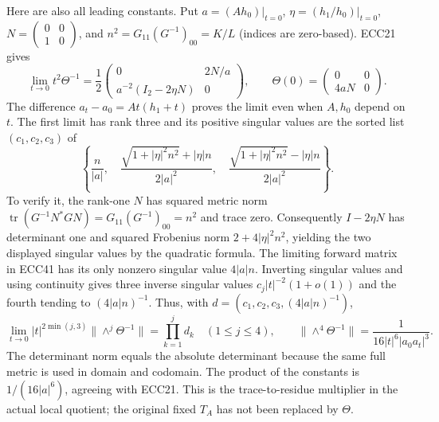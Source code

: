\documentclass[11pt]{article}
\newcommand{\Tr}{\operatorname{tr}}\newcommand{\Res}{\operatorname{Res}}
\begin{document}
Here are also all leading constants. Put $a=(Ah_0)|_{t=0}$,
$\eta=(h_1/h_0)|_{t=0}$, $N=\left(\begin{smallmatrix}0&0\\1&0\end{smallmatrix}\right)$,
and $n^2=G_{11}(G^{-1})_{00}=K/L$ (indices are zero-based). ECC21 gives
\begin{equation}
 \lim_{t\to0}t^2\Theta^{-1}=
 \frac12\begin{pmatrix}0&2N/a\\a^{-2}(I_2-2\eta N)&0\end{pmatrix},\qquad
 \Theta(0)=\begin{pmatrix}0&0\\4aN&0\end{pmatrix}.
 \tag{ECC41}
\end{equation}
The difference $a_t-a_0=A t(h_1+t)$ proves the limit even when $A,h_0$
depend on $t$. The first limit has rank three and its positive singular
values are the sorted list $(c_1,c_2,c_3)$ of
\begin{equation}
 \left\{\frac n{|a|},\quad
 \frac{\sqrt{1+|\eta|^2n^2}+|\eta|n}{2|a|^2},\quad
 \frac{\sqrt{1+|\eta|^2n^2}-|\eta|n}{2|a|^2}\right\}.
 \tag{ECC42}
\end{equation}
To verify it, the rank-one $N$ has squared metric norm
$\Tr(G^{-1}N^*GN)=G_{11}(G^{-1})_{00}=n^2$ and trace zero.
Consequently $I-2\eta N$ has determinant one and squared Frobenius norm
$2+4|\eta|^2n^2$, yielding the two displayed singular values by the
quadratic formula. The limiting forward matrix in ECC41 has its only
nonzero singular value $4|a|n$. Inverting singular values and using
continuity gives three inverse singular values $c_j|t|^{-2}(1+o(1))$
and the fourth tending to $(4|a|n)^{-1}$. Thus, with
$d=(c_1,c_2,c_3,(4|a|n)^{-1})$,
\begin{equation}
 \lim_{t\to0}|t|^{2\min(j,3)}\|\wedge^j\Theta^{-1}\|
 =\prod_{k=1}^j d_k\quad(1\le j\le4),\qquad
 \|\wedge^4\Theta^{-1}\|=\frac1{16|t|^6|a_0a_t|^3}.
 \tag{ECC43}
\end{equation}
The determinant norm equals the absolute determinant because the same
full metric is used in domain and codomain. The product of the constants
is $1/(16|a|^6)$, agreeing with ECC21. This is the trace-to-residue
multiplier in the actual local quotient; the original fixed $T_A$
has not been replaced by $\Theta$.
\end{document}
